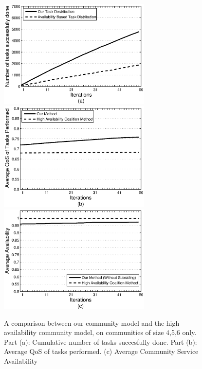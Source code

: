 \begin{figure}[!t]
\centering
\includegraphics[width=3in]{Figures/avg_task_ws_done.eps}
\includegraphics[width=3in]{Figures/avg_qos_ws_done.eps}
\includegraphics[width=3in]{Figures/avg_avail_ws_done.eps}
\caption{A comparison between our community model and the high availability community model, on communities of size 4,5,6 only. Part (a): Cumulative number of tasks succesfully done. Part
(b): Average QoS of tasks performed. (c) Average Community Service Availability} \label{fig_avail_method}
\end{figure}

